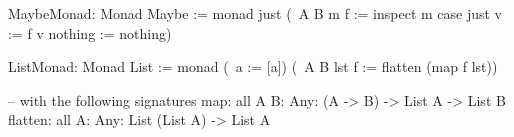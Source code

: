 \begin{alba}
    MaybeMonad: Monad Maybe :=
        monad
            just
            (\ {A B} m f :=
                inspect m case
                    just v  := f v
                    nothing := nothing)

    ListMonad: Monad List :=
        monad
            (\ a := [a])
            (\ {A B} lst f :=
                flatten (map f lst))

    -- with the following signatures
    map:
        all {A B: Any}: (A -> B) -> List A -> List B
    flatten:
        all {A: Any}: List (List A) -> List A
\end{alba}
